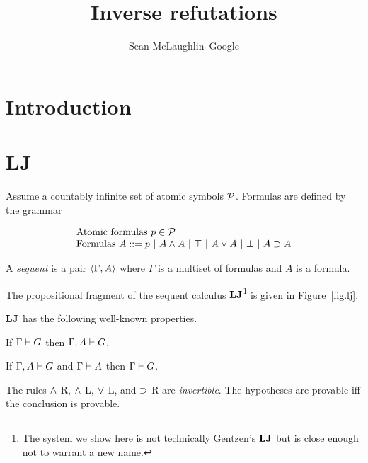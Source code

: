 \documentclass[]{article}
\begin{document}
\title{Inverse refutations}
\author{Sean McLaughlin\ Google}

\section{Introduction}
\label{sec:intro}

\section{LJ}
\label{sec:lj}

\begin{definition}[Formula]
  Assume a countably infinite set of atomic symbols $\mathcal{P}$.
  Formulas are defined by the grammar

  \[
  \begin{array}{l}
    \mbox{Atomic formulas } p \in \mathcal{P}\\
    \mbox{Formulas }A ::= p \ |\  A \wedge A \ |\  \top \ |\  A \vee A \ |\ 
    \bot \ |\  A \supset A
  \end{array}
  \]
\end{definition}

\begin{definition}[Sequent]
  A \emph{sequent} is a pair $\left<\Gamma, A\right>$ where $\Gamma$ is a
  multiset of formulas and $A$ is a formula.
\end{definition}

The propositional fragment of the sequent calculus
$\mathbf{LJ}$\footnote{The system we show here is not technically Gentzen's
$\mathbf{LJ}$ but is close enough not to warrant a new name.} is given in
Figure~\ref{fig.lj}.



$\mathbf{LJ}$ has the following well-known properties.

\begin{theorem}[Weakening]
  \label{thm:lj-weaken}
  If $\Gamma \vdash G$ then $\Gamma, A \vdash G$.
\end{theorem}

\begin{theorem}[Cut]
  \label{thm:lj-cut}
  If $\Gamma, A \vdash G$ and $\Gamma \vdash A$ then $\Gamma \vdash G$.
\end{theorem}

\begin{theorem}[Invertability]
  \label{thm:lj-invert}
  The rules $\wedge$-R, $\wedge$-L, $\vee$-L, and $\supset$-R are \emph{invertible}.
  The hypotheses are provable iff the conclusion is provable.
\end{theorem}
\end{document}
